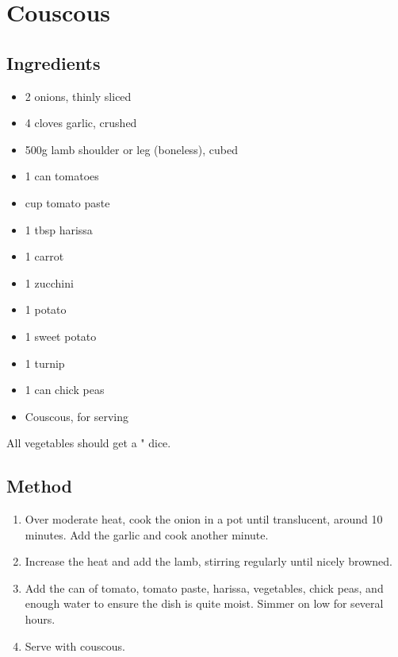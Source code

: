 \clearpage
\section{Couscous}



\subsection{Ingredients}

\begin{itemize}
	\item 2 onions, thinly sliced
	\item 4 cloves garlic, crushed
	\item 500g lamb shoulder or leg (boneless), cubed
	\item 1 can tomatoes
	\item {} cup tomato paste
	\item 1 tbsp harissa
	\item 1 carrot
	\item 1 zucchini
	\item 1 potato
	\item 1 sweet potato
	\item 1 turnip
	\item 1 can chick peas
	\item Couscous, for serving
\end{itemize}

All vegetables should get a " dice.

\subsection{Method}

\begin{enumerate}
	\item Over moderate heat, cook the onion in a pot until translucent, around 10 minutes. Add the garlic and cook another minute.
	\item Increase the heat and add the lamb, stirring regularly until nicely browned.
	\item Add the can of tomato, tomato paste, harissa, vegetables, chick peas, and enough water to ensure the dish is quite moist. Simmer on low for several hours.
	\item Serve with couscous.
\end{enumerate}
